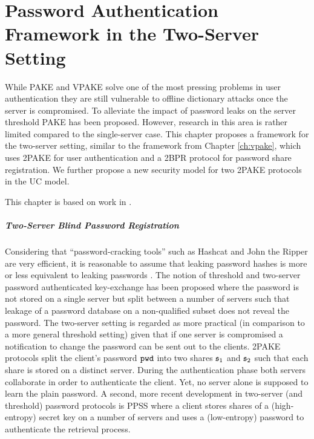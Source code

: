 \chapter{Password Authentication Framework in the Two-Server Setting} \label{ch:2pake}

While \ac{PAKE} and \ac{VPAKE} solve one of the most pressing problems in user authentication they are still vulnerable to offline dictionary attacks once the server is compromised.
To alleviate the impact of password leaks on the server threshold \ac{PAKE} has been proposed.
However, research in this area is rather limited compared to the single-server case.
This chapter proposes a framework for the two-server setting, similar to the framework from Chapter \ref{ch:vpake}, which uses \ac{2PAKE} for user authentication and a \ac{2BPR} protocol for password share registration.
We further propose a new security model for two \ac{2PAKE} protocols in the \ac{UC} model.

This chapter is based on work in \cite{KieferM14b,KieferM15b,KieferM15c}.

\paragraph{Two-Server Blind Password Registration}

Considering that ``password-cracking tools'' such as Hashcat \cite{hashcat} and John the Ripper \cite{JohnTheRipper} are very efficient, it is reasonable to assume that leaking password hashes is more or less equivalent to leaking passwords \cite{NarayananS05a,WeirAMG09,DellAmicoMR10,Bonneau12}.
The notion of threshold and two-server password authenticated key-exchange \cite{FordK00,MacKenzieSJ02} has been proposed where the password is not stored on a single server but split between a number of servers such that leakage of a password database on a non-qualified subset does not reveal the password.
The two-server setting is regarded as more practical (in comparison to a more general threshold setting) given that if one server is compromised a notification to change the password can be sent out to the clients.
\ac{2PAKE} protocols \cite{BrainardJKS03,SzydloK05,Katz2012a} split the client's password $\mathtt{pwd}$ into two shares $\mathfrak{s}_1$ and $\mathfrak{s}_2$ such that each share is stored on a distinct server.
During the authentication phase both servers collaborate in order to authenticate the client.
Yet, no server alone is supposed to learn the plain password.
A second, more recent development in two-server (and threshold) password protocols is \ac{PPSS} \cite{Bagherzandi2011,Camenisch2012,JareckiKK14} where a client stores shares of a (high-entropy) secret key on a number of servers and uses a (low-entropy) password to authenticate the retrieval process.

